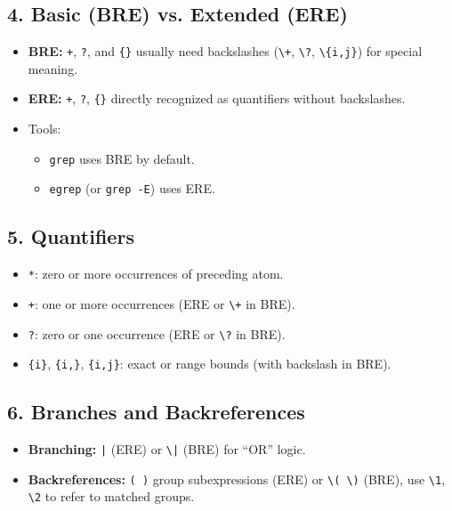 \documentclass[a4paper]{report}
\begin{document}
\subsection*{4. Basic (BRE) vs. Extended (ERE)}
\begin{itemize}
    \item \textbf{BRE:} \texttt{+}, \texttt{?}, and \texttt{\{\}} usually need backslashes (\texttt{\textbackslash +}, \texttt{\textbackslash ?}, \texttt{\textbackslash \{i,j\}}) for special meaning.
    \item \textbf{ERE:} \texttt{+}, \texttt{?}, \texttt{\{\}} directly recognized as quantifiers without backslashes.
    \item Tools:
        \begin{itemize}
            \item \texttt{grep} uses BRE by default.
            \item \texttt{egrep} (or \texttt{grep -E}) uses ERE.
        \end{itemize}
\end{itemize}

\subsection*{5. Quantifiers}
\begin{itemize}
    \item \texttt{*}: zero or more occurrences of preceding atom.
    \item \texttt{+}: one or more occurrences (ERE or \texttt{\textbackslash +} in BRE).
    \item \texttt{?}: zero or one occurrence (ERE or \texttt{\textbackslash ?} in BRE).
    \item \texttt{\{i\}}, \texttt{\{i,\}}, \texttt{\{i,j\}}: exact or range bounds (with backslash in BRE).
\end{itemize}

\subsection*{6. Branches and Backreferences}
\begin{itemize}
    \item \textbf{Branching:} \texttt{|} (ERE) or \texttt{\textbackslash |} (BRE) for “OR” logic.
    \item \textbf{Backreferences:} \texttt{( )} group subexpressions (ERE) or \texttt{\textbackslash( \textbackslash)} (BRE), use \texttt{\textbackslash 1}, \texttt{\textbackslash 2} to refer to matched groups.
\end{itemize}
\end{document}
